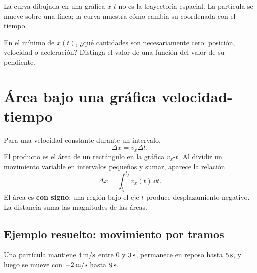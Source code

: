 \documentclass[11pt]{article}
\begin{document}
La curva dibujada en una gráfica \(x\)-\(t\) no es la trayectoria espacial. La
partícula se mueve sobre una línea; la curva muestra cómo cambia su coordenada
con el tiempo.

\begin{pregunta}
En el mínimo de \(x(t)\), ¿qué cantidades son necesariamente cero: posición,
velocidad o aceleración? Distinga el valor de una función del valor de su
pendiente.
\end{pregunta}

\section{Área bajo una gráfica velocidad-tiempo}

Para una velocidad constante durante un intervalo,
\[
  \Delta x=v_x\Delta t.
\]
El producto es el área de un rectángulo en la gráfica \(v_x\)-\(t\). Al dividir
un movimiento variable en intervalos pequeños y sumar, aparece la relación
\[
  \Delta x
  =
  \int_{t_i}^{t_f}v_x(t)\,\dd t.
\]
El área es \textbf{con signo}: una región bajo el eje \(t\) produce
desplazamiento negativo. La distancia suma las magnitudes de las áreas.

\subsection{Ejemplo resuelto: movimiento por tramos}

Una partícula mantiene \(4\,\mathrm{m/s}\) entre \(0\) y \(3\,\mathrm{s}\),
permanece en reposo hasta \(5\,\mathrm{s}\), y luego se mueve con
\(-2\,\mathrm{m/s}\) hasta \(9\,\mathrm{s}\).

\begin{center}
\end{center}
\end{document}
